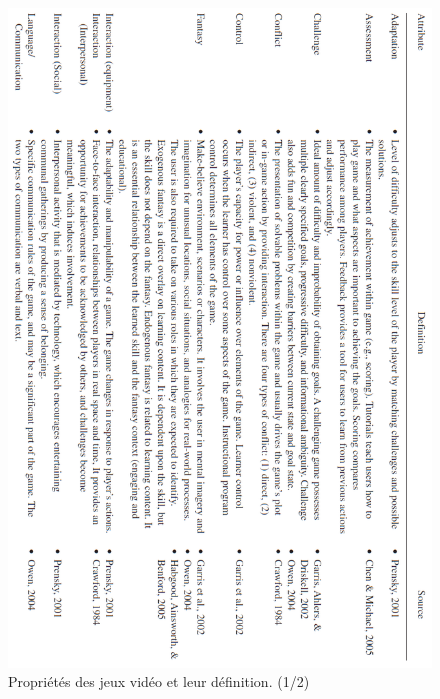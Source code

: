 \begin{figure}[htbp]
	\centering
	\includegraphics[width=\linewidth, height=\textheight ]{images/game_attributes_one}
	\caption{Propriétés des jeux vidéo et leur définition. (1/2) \cite{Wils09}}
	\label{game_attributes_one}
\end{figure}
